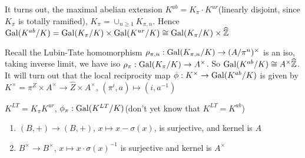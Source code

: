 \documentclass[main]{subfiles}
\begin{document}
It turns out, the maximal abelian extension $K^{ab}=K_\pi\cdot K^{ur}$(linearly disjoint, since $K_\pi$ is totally ramified), $K_\pi=\cup_{n\geq1}K_{\pi,n}$. Hence $\operatorname{Gal}(K^{ab}/K)=\operatorname{Gal}(K_\pi/K)\times\operatorname{Gal}(K^{ur}/K)\cong\operatorname{Gal}(K_\pi/K)\times\widehat{\mathbb Z}$

Recall the Lubin-Tate homomorphism $\rho_{\pi,n}:\operatorname{Gal}(K_{\pi,n}/K)\to(A/\pi^n)^\times$ is an iso, taking inverse limit, we have iso $\rho_\pi:\operatorname{Gal}(K_\pi/K)\to A^\times$. So $\operatorname{Gal}(K^{ab}/K)\cong A^\times\widehat{\mathbb Z}$. It will turn out that the local reciprocity map $\phi:K^\times\to\operatorname{Gal}(K^{ab}/K)$ is given by $K^\times= \pi^Z\times A^\times\to \widehat Z\times A^\times$, $(\pi^i,a)\mapsto(i,a^{-1})$


\begin{definition}
$K^{LT}=K_\pi K^{ur}$, $\phi_\pi:\operatorname{Gal}(K^{LT}/K)$(don't yet know that $K^{LT}=K^{ab}$)
\end{definition}

\begin{lemma}
\begin{enumerate}
\item $(B,+)\to(B,+)$, $x\mapsto x-\sigma(x)$, is surjective, and kernel is $A$
\item $B^\times\to B^\times$, $x\mapsto x\cdot\sigma(x)^{-1}$ is surjective and kernel is $A^\times$
\end{enumerate}
\end{lemma}
\end{document}
